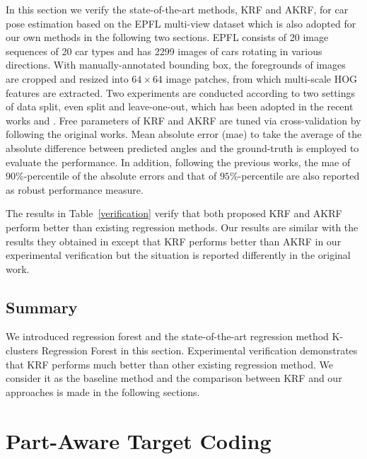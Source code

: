 \documentclass{tutmscthesis}[2010/09/22]
\numberwithin{equation}{section}
\numberwithin{table}{section}
\numberwithin{figure}{section}
\begin{document}
In this section we verify the state-of-the-art methods, KRF and AKRF, for car pose estimation based on the EPFL multi-view dataset which is also adopted for our own methods in the following two sections. EPFL consists of 20 image sequences of 20 car types and has 2299 images of cars rotating in various directions. With manually-annotated bounding box, the foregrounds of images are cropped and resized into  $64 \times 64$ image patches, from which multi-scale HOG features \cite{dalal2005histograms} are extracted. 
Two experiments are conducted according to two settings of data split, even split and leave-one-out, which has been adopted in the recent works \cite{fenzi2013class} and \cite{hara2014growing}. Free parameters of KRF and AKRF are tuned via cross-validation by following the original works. Mean absolute error (mae) to take the average of the absolute difference between predicted angles and the ground-truth is employed to evaluate the performance. 
In addition, following the previous works, the mae of $90 \%$-percentile of the absolute errors and that of $95 \%$-percentile are also reported as robust performance measure. 

The results in Table~\ref{verification} verify that both proposed KRF and AKRF perform better than existing regression methods. Our results are similar with the results they obtained in \cite{hara2014growing} except that KRF performs better than AKRF in our experimental verification but the situation is reported differently in the original work. 



\subsection{Summary}

We introduced regression forest and the state-of-the-art regression method K-clusters Regression Forest in this section. Experimental verification demonstrates that KRF performs much better than other existing regression method. We consider it as the baseline method and the comparison between KRF and our approaches is made in the following sections.  


\section{Part-Aware Target Coding}\label{sec:visibleparts}
\end{document}
